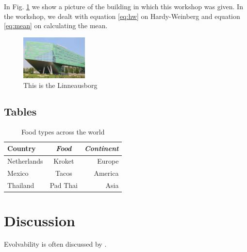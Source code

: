 \documentclass[10pt]{article}
\begin{document}
In Fig. \ref{fig:linneausborg} we show a picture of the building in which this workshop was given. In the workshop, we dealt with equation \ref{eq:hw} on Hardy-Weinberg and equation \ref{eq:mean} on calculating the mean.

\begin{figure}[ht]
    \centering
    \includegraphics[width = 0.3\textwidth]{linnaeusborg1.jpg}
    \caption{This is the Linneausborg}
    \label{fig:linneausborg}
\end{figure}

\subsection{Tables}
\begin{table}[ht]
    \centering
    \begin{tabular}{|l|c|r|}
    \hline
    \textbf{Country}  & \textit{Food} & \textbf{\textit{Continent}} \\
     \hline
     Netherlands  & Kroket & Europe \\
     Mexico & Tacos & America \\
     Thailand & Pad Thai & Asia \\
     \hline
    \end{tabular}
    \caption{Food types across the world}
    \label{tab:food}
\end{table}

\section{Discussion}
Evolvability \citep{riederer2022} is often discussed by \cite{riederer2022}.






\end{document}
